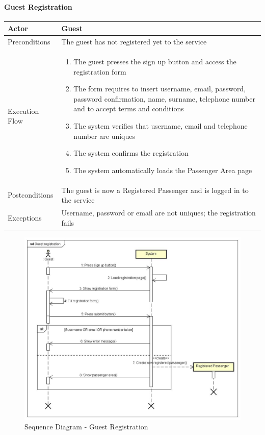\paragraph{Guest Registration}
\begin{center}
	\begin{tabular}{ | l | p{8cm} |}
		\hline
		Actor &  Guest	\\ \hline
		Preconditions & The guest has not registered yet to the service		\\ \hline
		Execution Flow & \begin{enumerate}
			\item The guest presses the sign up button and access the registration form
			\item The form requires to insert username, email, password, password confirmation, name, surname, telephone number and to accept terms and conditions
			\item The system verifies that username, email and telephone number are uniques
			\item The system confirms the registration
			\item The system automatically loads the Passenger Area page
		\end{enumerate}		\\ \hline
		Postconditions & The guest is now a Registered Passenger and is logged in to the service	\\ \hline
		Exceptions & Username, password or email are not uniques; the registration fails \\ \hline
	\end{tabular}
\end{center}
\newpage
\begin{landscape}
\begin{figure}[!h]
	\begin{center}			
		\includegraphics[height=\textheight]{../SE2_SD/GuestRegistration}
		\caption{Sequence Diagram - Guest Registration}	
	\end{center}
\end{figure}
\end{landscape}
\newpage
